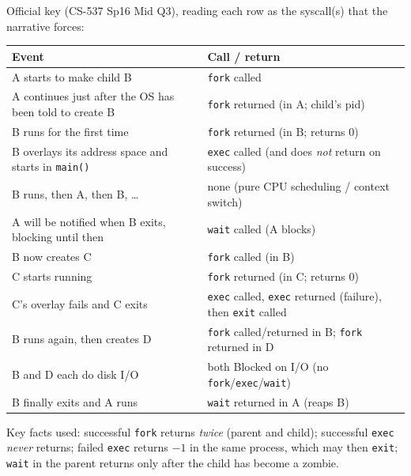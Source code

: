 \documentclass[11pt,a4paper]{article}
\newenvironment{Sol}{%
  \begin{tcolorbox}[sboxstyle, title={Solution}]%
}{%
  \end{tcolorbox}\vspace{0.35em}%
}
\begin{document}
\begin{Sol}
Official key (CS-537 Sp16 Mid Q3), reading each row as the syscall(s) that the narrative forces:
\begin{center}
\begin{tabular}{p{}p{}}
\hline
Event & Call / return \\
\hline
A starts to make child B
  & \texttt{fork} called \\
A continues just after the OS has been told to create B
  & \texttt{fork} returned (in A; child's pid) \\
B runs for the first time
  & \texttt{fork} returned (in B; returns 0) \\
B overlays its address space and starts in \texttt{main()}
  & \texttt{exec} called (and does \emph{not} return on success) \\
B runs, then A, then B, \ldots
  & none (pure CPU scheduling / context switch) \\
A will be notified when B exits, blocking until then
  & \texttt{wait} called (A blocks) \\
B now creates C
  & \texttt{fork} called (in B) \\
C starts running
  & \texttt{fork} returned (in C; returns 0) \\
C's overlay fails and C exits
  & \texttt{exec} called, \texttt{exec} returned (failure),
    then \texttt{exit} called \\
B runs again, then creates D
  & \texttt{fork} called/returned in B; \texttt{fork} returned in D \\
B and D each do disk I/O
  & both Blocked on I/O (no \texttt{fork}/\texttt{exec}/\texttt{wait}) \\
B finally exits and A runs
  & \texttt{wait} returned in A (reaps B) \\
\hline
\end{tabular}
\end{center}
Key facts used: successful \texttt{fork} returns \emph{twice} (parent and child); successful \texttt{exec} \emph{never} returns; failed \texttt{exec} returns $-1$ in the same process, which may then \texttt{exit}; \texttt{wait} in the parent returns only after the child has become a zombie.
\end{Sol}
\end{document}
